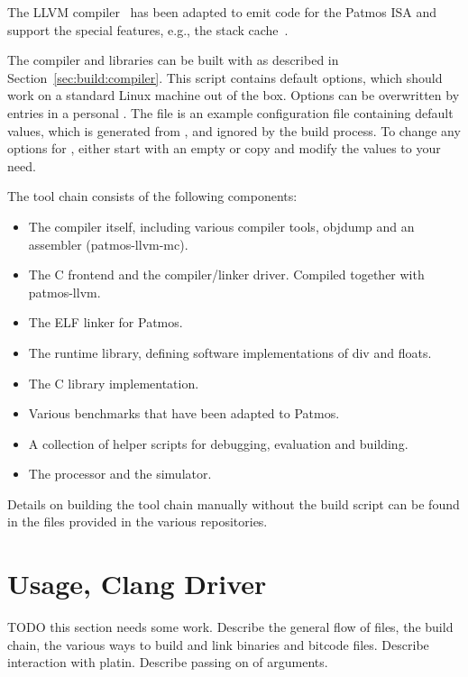 The LLVM compiler~\cite{Seus13:compiler} has been adapted to emit code for the Patmos ISA
and support the special features, e.g., the stack cache~\cite{patmos:stack:seus}.

The compiler and libraries can be built with  as described in Section~\ref{sec:build:compiler}.
This script contains default options, which should work on a
standard Linux machine out of the box. Options can be overwritten by
entries in a personal . The file 
is an example configuration file containing default values, which is
generated from , and ignored by the build process.
To change any options for , either start with an empty  or
copy  and modify the values to your need.

The tool chain consists of the following components:

\begin{itemize}
\item {} The compiler itself, including various compiler tools, objdump and an assembler (patmos-llvm-mc).
\item {} The C frontend and the compiler/linker driver. Compiled together with patmos-llvm.
\item {} The  ELF linker for Patmos.
\item {} The runtime library, defining software implementations of div and floats.
\item {} The C library implementation.
\item {} Various benchmarks that have been adapted to Patmos.
\item {} A collection of helper scripts for debugging, evaluation and building.
\item {} The processor and the simulator.
\end{itemize}

Details on building the tool chain manually without the build script can be found in the 
files provided in the various repositories.


\section{Usage, Clang Driver}

TODO this section needs some work. Describe the general flow of files, the build chain, the various ways to build
and link binaries and bitcode files. Describe interaction with platin. Describe passing on of arguments.

